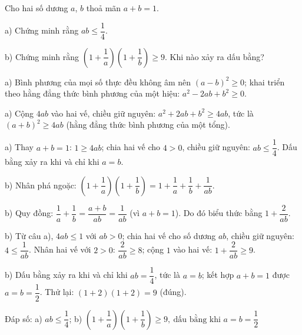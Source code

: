 \begin{problem}[9DS-BPT-020]
Cho hai số dương $a$, $b$ thoả mãn $a + b = 1$.

a) Chứng minh rằng $ab \leq \dfrac{1}{4}$.

b) Chứng minh rằng $\left(1 + \dfrac{1}{a}\right)\left(1 + \dfrac{1}{b}\right) \geq 9$. Khi nào xảy ra dấu bằng?

\begin{solution}
a) Bình phương của mọi số thực đều không âm nên $(a - b)^2 \geq 0$; khai triển theo hằng đẳng thức bình phương của một hiệu: $a^2 - 2ab + b^2 \geq 0$.

a) Cộng $4ab$ vào hai vế, chiều giữ nguyên: $a^2 + 2ab + b^2 \geq 4ab$, tức là $(a + b)^2 \geq 4ab$ (hằng đẳng thức bình phương của một tổng).

a) Thay $a + b = 1$: $1 \geq 4ab$; chia hai vế cho $4 > 0$, chiều giữ nguyên: $ab \leq \dfrac{1}{4}$. Dấu bằng xảy ra khi và chỉ khi $a = b$.

b) Nhân phá ngoặc: $\left(1 + \dfrac{1}{a}\right)\left(1 + \dfrac{1}{b}\right) = 1 + \dfrac{1}{a} + \dfrac{1}{b} + \dfrac{1}{ab}$.

b) Quy đồng: $\dfrac{1}{a} + \dfrac{1}{b} = \dfrac{a + b}{ab} = \dfrac{1}{ab}$ (vì $a + b = 1$). Do đó biểu thức bằng $1 + \dfrac{2}{ab}$.

b) Từ câu a), $4ab \leq 1$ với $ab > 0$; chia hai vế cho số dương $ab$, chiều giữ nguyên: $4 \leq \dfrac{1}{ab}$. Nhân hai vế với $2 > 0$: $\dfrac{2}{ab} \geq 8$; cộng $1$ vào hai vế: $1 + \dfrac{2}{ab} \geq 9$.

b) Dấu bằng xảy ra khi và chỉ khi $ab = \dfrac{1}{4}$, tức là $a = b$; kết hợp $a + b = 1$ được $a = b = \dfrac{1}{2}$. Thử lại: $(1 + 2)(1 + 2) = 9$ (đúng).

Đáp số: a) $\boxed{ab \leq \dfrac{1}{4}}$; b) $\boxed{\left(1 + \dfrac{1}{a}\right)\left(1 + \dfrac{1}{b}\right) \geq 9,\ \text{dấu bằng khi } a = b = \dfrac{1}{2}}$
\end{solution}
\end{problem}

